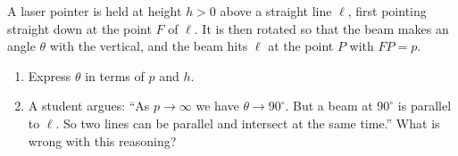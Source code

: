 A laser pointer is held at height $h>0$ above a straight line $\ell$, first pointing straight down at the point $F$ of $\ell$. It is then rotated so that the beam makes an angle $\theta$ with the vertical, and the beam hits $\ell$ at the point $P$ with $FP=p$.
\begin{enumerate}
\item[(a)] Express $\theta$ in terms of $p$ and $h$.
\item[(b)] A student argues: ``As $p\to\infty$ we have $\theta\to90^\circ$. But a beam at $90^\circ$ is parallel to $\ell$. So two lines can be parallel and intersect at the same time.'' What is wrong with this reasoning?
\end{enumerate}
